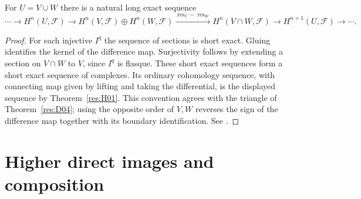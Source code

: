 \begin{theorem}\label{res:H05}
For \(U=V\cup W\) there is a natural long exact sequence
\[
 \cdots\longrightarrow H^n(U,\mathcal F)
 \longrightarrow H^n(V,\mathcal F)\oplus H^n(W,\mathcal F)
 \xrightarrow{\operatorname{res}_V-\operatorname{res}_W}
 H^n(V\cap W,\mathcal F)
 \longrightarrow H^{n+1}(U,\mathcal F)\longrightarrow\cdots .
\]
\end{theorem}
\begin{proof}
For each injective \(I^q\) the sequence of sections is short exact.
Gluing identifies the kernel of the difference map. Surjectivity
follows by extending a section on \(V\cap W\) to \(V\), since \(I^q\)
is flasque. These short exact sequences form a short exact sequence
of complexes. Its ordinary cohomology sequence, with connecting map
given by lifting and taking the differential, is the displayed
sequence by Theorem~\ref{res:H01}. This convention agrees with the
triangle of Theorem~\ref{res:D04}; using the opposite order of \(V,W\)
reverses the sign of the difference map together with its boundary
identification. See \cite[Tag 01EB]{stacks-sheaf}.
\end{proof}

\section{Higher direct images and composition}


